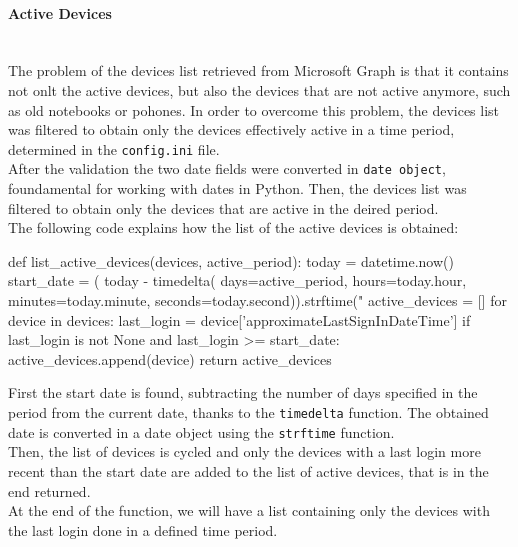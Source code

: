 \documentclass[12pt, a4paper, oneside]{article}
\begin{document}
\paragraph{Active Devices} ~\\
The problem of the devices list retrieved from Microsoft Graph is that it contains not onlt the active devices, but also the devices that are not active anymore, such as old notebooks or pohones.
In order to overcome this problem, the devices list was filtered to obtain only the devices effectively active in a time period, determined in the \texttt{config.ini} file.\\
After the validation the two date fields were converted in \texttt{date object}, foundamental for working with dates in Python. Then, the devices list was filtered to obtain only the devices that are active 
in the deired period.\\
The following code explains how the list of the active devices is obtained:
\begin{python}
def list_active_devices(devices, active_period):
   today = datetime.now()
   start_date = (
      today -
      timedelta(
         days=active_period,
         hours=today.hour,
         minutes=today.minute,
         seconds=today.second)).strftime("%
   active_devices = []
   for device in devices:
       last_login = device['approximateLastSignInDateTime']
       if last_login is not None and last_login >= start_date:
           active_devices.append(device)
   return active_devices
\end{python}
First the start date is found, subtracting the number of days specified in the period from the current date, thanks to the \texttt{timedelta} function. The obtained date is converted in a date object using the
\texttt{strftime} function.\\
Then, the list of devices is cycled and only the devices with a last login more recent than the start date are added to the list of active devices, that is in the end returned.\\
At the end of the function, we will have a list containing only the devices with the last login done in a defined time period.
\end{document}
